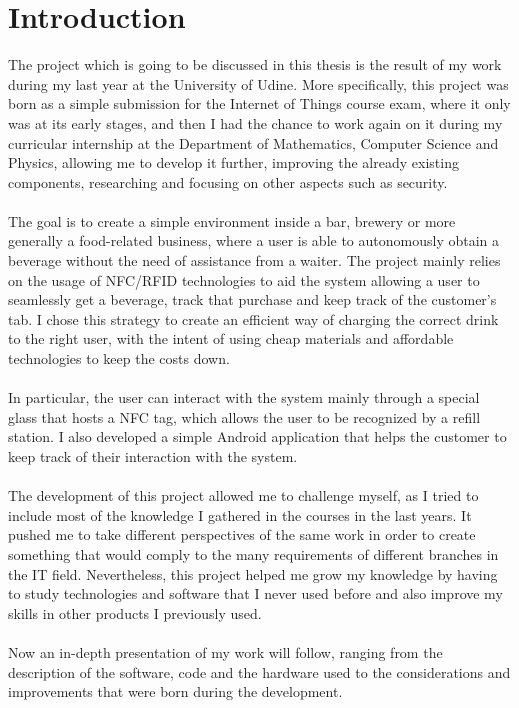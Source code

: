 \documentclass[target=bach,aauheader=,style=]{thud}
\begin{document}
\chapter{Introduction}
The project which is going to be discussed in this thesis is the result of my work during my last year at the University of Udine. More specifically, this project was born as a simple submission for the Internet of Things course exam, where it only was at its early stages, and then I had the chance to work again on it during my curricular internship at the Department of Mathematics, Computer Science and Physics, allowing me to develop it further, improving the already existing components, researching and focusing on other aspects such as security.\\
\\
The goal is to create a simple environment inside a bar, brewery or more generally a food-related business, where a user is able to autonomously obtain a beverage without the need of assistance from a waiter. The project mainly relies on the usage of NFC/RFID technologies to aid the system allowing a user to seamlessly get a beverage, track that purchase and keep track of the customer's tab. I chose this strategy to create an efficient way of charging the correct drink to the right user, with the intent of using cheap materials and affordable technologies to keep the costs down. \\
\\ 
In particular, the user can interact with the system mainly through a special glass that hosts a NFC tag, which allows the user to be recognized by a refill station. I also developed a simple Android application that helps the customer to keep track of their interaction with the system.\\
\\
The development of this project allowed me to challenge myself, as I tried to include most of the knowledge I gathered in the courses in the last years. It pushed me to take different perspectives of the same work in order to create something that would comply to the many requirements of different branches in the IT field. Nevertheless, this project helped me grow my knowledge by having to study technologies and software that I never used before and also improve my skills in other products I previously used.\\
\\
Now an in-depth presentation of my work will follow, ranging from the description of the software, code and the hardware used to the considerations and improvements that were born during the development.
\end{document}
